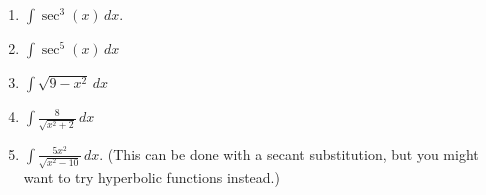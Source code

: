 \documentclass[12pt]{article}
\newcommand{\di}{\displaystyle}
\begin{document}
\begin{multicols}{2}
\begin{enumerate}
 \item $\di \int \sec^3(x)\,dx$. 

 \item $\di \int \sec^5(x)\,dx$

 \item $\di \int \sqrt{9-x^2}\,dx$

 \item $\di \int \frac{8}{\sqrt{x^2+2}}\,dx$

 \item $\di \int \frac{5x^2}{\sqrt{x^2-10}}\,dx$. (This can be done with a secant substitution, but you might want to try hyperbolic functions instead.)

 \end{enumerate}
\end{multicols}
\end{document}
